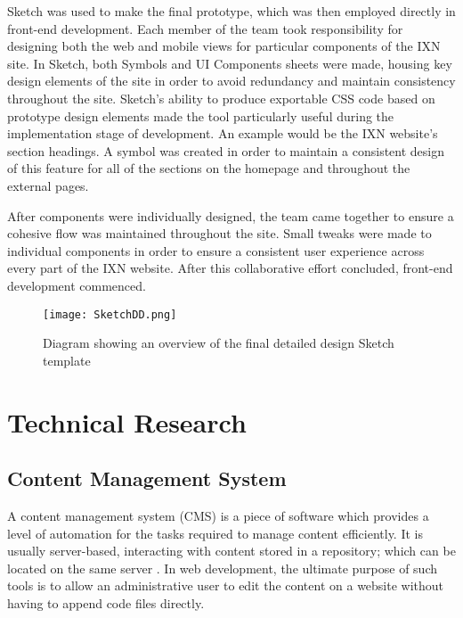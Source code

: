 \documentclass[fontsize=11pt]{extarticle}
\numberwithin{figure}{section} %
\begin{document}
Sketch was used to make the final prototype, which was then employed
directly in front-end development. Each member of the team took
responsibility for designing both the web and mobile views for
particular components of the IXN site. In Sketch, both Symbols and UI
Components sheets were made, housing key design elements of the site in
order to avoid redundancy and maintain consistency throughout the site.
Sketch's ability to produce exportable CSS code based on prototype
design elements made the tool particularly useful during the
implementation stage of development. An example would be the IXN
website's section headings. A symbol was created in order to maintain a
consistent design of this feature for all of the sections on the
homepage and throughout the external pages.

After components were individually designed, the team came together to
ensure a cohesive flow was maintained throughout the site. Small tweaks
were made to individual components in order to ensure a consistent user
experience across every part of the IXN website. After this
collaborative effort concluded, front-end development commenced.

\begin{figure}[H]
\centering
\texttt{[image: SketchDD.png]}
\caption{Diagram showing an overview of the final detailed design Sketch template}
\label{sketchdd}
\end{figure}

\newpage

\hypertarget{technical-research}{%
\section{Technical Research}\label{technical-research}}

\hypertarget{content-management-system}{%
\subsection{Content Management System}\label{content-management-system}}

A content management system (CMS) is a piece of software which provides
a level of automation for the tasks required to manage content
efficiently. It is usually server-based, interacting with content stored
in a repository; which can be located on the same server \cite{p1}. In
web development, the ultimate purpose of such tools is to allow an
administrative user to edit the content on a website without having to
append code files directly.
\end{document}
